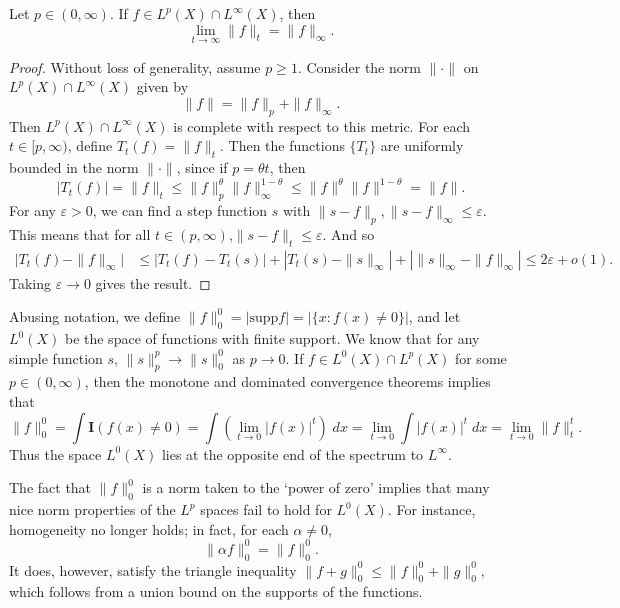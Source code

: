 \begin{theorem}
    Let $p \in (0,\infty)$. If $f \in L^p(X) \cap L^\infty(X)$, then
    \[ \lim_{t \to \infty} \| f \|_t = \| f \|_\infty. \]
\end{theorem}
\begin{proof}
    Without loss of generality, assume $p \geq 1$. Consider the norm $\| \cdot \|$ on $L^p(X) \cap L^\infty(X)$ given by
    \[ \| f \| = \| f \|_p + \| f \|_\infty. \]
    Then $L^p(X) \cap L^\infty(X)$ is complete with respect to this metric. For each $t \in [p,\infty)$, define $T_t(f) = \| f \|_t$. Then the functions $\{ T_t \}$ are uniformly bounded in the norm $\| \cdot \|$, since if $p = \theta t$, then
    \[ |T_t(f)| = \| f \|_t \leq \| f \|_p^\theta \| f \|_\infty^{1-\theta} \leq \| f \|^\theta \| f \|^{1-\theta} = \| f \|. \]
    For any $\varepsilon > 0$, we can find a step function $s$ with $\| s - f \|_p, \| s - f \|_\infty \leq \varepsilon$. This means that for all $t \in (p,\infty)$,$\| s - f \|_t \leq \varepsilon$. And so
    \begin{align*}
        \Big| T_t(f) - \| f \|_\infty \Big| &\leq |T_t(f) - T_t(s)| + |T_t(s) - \| s \|_\infty| + |\| s \|_\infty - \| f \|_\infty| \leq 2\varepsilon + o(1). 
    \end{align*}
    Taking $\varepsilon \to 0$ gives the result.
\end{proof}

Abusing notation, we define $\| f \|_0^0 = | \text{supp} f | = | \{ x: f(x) \neq 0 \} |$, and let $L^0(X)$ be the space of functions with finite support. We know that for any simple function $s$, $\| s \|_p^p \to \| s \|_0^0$ as $p \to 0$. If $f \in L^0(X) \cap L^p(X)$ for some $p \in (0,\infty)$, then the monotone and dominated convergence theorems implies that
%
\[ \| f \|_0^0 = \int \mathbf{I}(f(x) \neq 0) = \int \left( \lim_{t \to 0} |f(x)|^t \right)\; dx = \lim_{t \to 0} \int |f(x)|^t\; dx = \lim_{t \to 0} \| f \|_t^t. \]
%
Thus the space $L^0(X)$ lies at the opposite end of the spectrum to $L^\infty$.

The fact that $\| f \|_0^0$ is a norm taken to the `power of zero' implies that many nice norm properties of the $L^p$ spaces fail to hold for $L^0(X)$. For instance, homogeneity no longer holds; in fact, for each $\alpha \neq 0$,
%
\[ \| \alpha f \|_0^0 = \| f \|_0^0. \]
%
It does, however, satisfy the triangle inequality $\| f + g \|_0^0 \leq \| f \|_0^0 + \| g \|_0^0$, which follows from a union bound on the supports of the functions.


